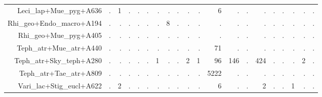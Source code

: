 \documentclass[a4paper, 11]{article}\usepackage[]{graphicx}\usepackage[]{color}
\begin{document}
\begin{table}
\begin{tabular}{rrrrrrrrrrrrrrrrrrrr}
  Leci\_lap+Mue\_pyg+A636 & . & 1 & . & . & . & . & . & . & . & . & 6 & . & . & . & . & . & . & . & . \\ 
  Rhi\_geo+Endo\_macro+A194 & . & . & . & . & . & . & 8 & . & . & . & . & . & . & . & . & . & . & . & . \\ 
  Rhi\_geo+Mue\_pyg+A405 & . & . & . & . & . & . & . & . & . & . & . & . & . & . & . & . & . & . & . \\ 
  Teph\_atr+Mue\_atr+A440 & . & . & . & . & . & . & . & . & . & . & 71 & . & . & . & . & . & . & . & . \\ 
  Teph\_atr+Sky\_teph+A280 & . & . & . & . & . & 1 & . & . & 2 & 1 & 96 & 146 & . & 424 & . & . & . & 2 & . \\ 
  Teph\_atr+Tae\_atr+A809 & . & . & . & . & . & . & . & . & . & . & 5222 & . & . & . & . & . & . & . & . \\ 
  Vari\_lac+Stig\_eucl+A622 & . & 2 & . & . & . & . & . & . & . & . & 6 & . & . & 2 & . & . & 1 & . & . \\ 
   \hline
\end{tabular}
\end{table}
\end{document}
